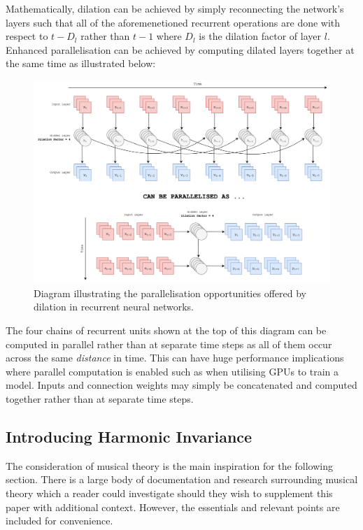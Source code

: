 \documentclass[12pt,]{article}
\begin{document}
Mathematically, dilation can be achieved by simply reconnecting the
network's layers such that all of the aforemenetioned recurrent
operations are done with respect to \(t-D_l\) rather than \(t-1\) where
\(D_l\) is the dilation factor of layer \(l\). Enhanced parallelisation
can be achieved by computing dilated layers together at the same time as
illustrated below:

\begin{figure}
\centering
\includegraphics{Images/dilatedrnnparallel.png}
\caption{Diagram illustrating the parallelisation opportunities offered
by dilation in recurrent neural networks.}
\end{figure}

The four chains of recurrent units shown at the top of this diagram can
be computed in parallel rather than at separate time steps as all of
them occur across the same \emph{distance} in time. This can have huge
performance implications where parallel computation is enabled such as
when utilising GPUs to train a model. Inputs and connection weights may
simply be concatenated and computed together rather than at separate
time steps.

\hypertarget{introducing-harmonic-invariance}{%
\subsection{Introducing Harmonic
Invariance}\label{introducing-harmonic-invariance}}

The consideration of musical theory is the main inspiration for the
following section. There is a large body of documentation and research
surrounding musical theory which a reader could investigate should they
wish to supplement this paper with additional context. However, the
essentials and relevant points are included for convenience.
\end{document}
